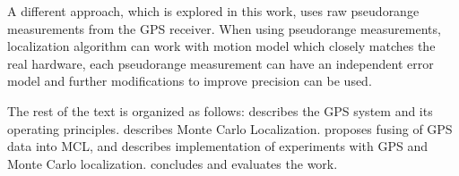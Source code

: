 A different approach, which is explored in this work, uses raw
pseudorange measurements from the GPS receiver.
When using pseudorange measurements, localization algorithm can work with motion model
which closely matches
the real hardware, each pseudorange measurement can have an
independent error model and further modifications to improve precision can be used.


\vspace{1.5em}




The rest of the text is organized as follows:
 describes the GPS system and its operating principles.
 describes Monte Carlo Localization.
 proposes fusing of GPS data into MCL, and
 describes implementation of experiments with GPS and
Monte Carlo localization.
 concludes and evaluates the work.
